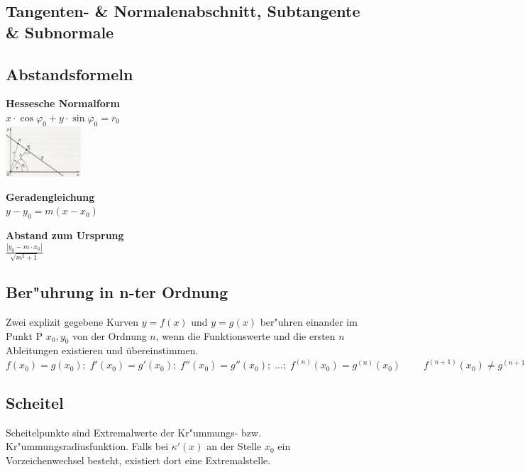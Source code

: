 \subsection{Tangenten- \& Normalenabschnitt, Subtangente \&
Subnormale}

\subsection{Abstandsformeln}
\begin{minipage}{6.5cm}
    \textbf{Hessesche Normalform}\\
    $x\cdot \cos\varphi_0 +y\cdot \sin\varphi_0=r_0$\\
    \includegraphics[width=2.8cm]{./bilder/hessenorm.png}
\end{minipage}
\begin{minipage}{6.5cm}
  \textbf{Geradengleichung} \\
  $y - y_0 = m (x - x_0)$
\end{minipage}
\begin{minipage}{6cm}
  \textbf{Abstand zum Ursprung} \\
  $\frac{|y_0 - m \cdot x_0|}{\sqrt{m^2 + 1}}$
\end{minipage}
\newline

\subsection{Ber"uhrung in n-ter Ordnung}
Zwei explizit gegebene Kurven $y = f(x)$ und $y = g(x)$ ber"uhren einander im
Punkt P $x_0, y_0$ von der Ordnung $n$, wenn die Funktionswerte und die ersten
$n$ Ableitungen existieren und übereinstimmen.\\
$f(x_0) = g(x_0);\; f'(x_0) = g'(x_0);\; f''(x_0) = g''(x_0);\;\ldots ;
\;f^{(n)}(x_0) = g^{(n)}(x_0)\; \qquad f^{(n+1)}(x_0) \neq g^{(n+1)}(x_0)$
\newline

\subsection{Scheitel }
Scheitelpunkte sind Extremalwerte der Kr"ummungs- bzw. Kr"ummungsradiusfunktion.
Falls bei $\kappa'(x)$ an der Stelle $x_0$ ein Vorzeichenwechsel besteht, existiert dort eine Extremalstelle.
\newline


